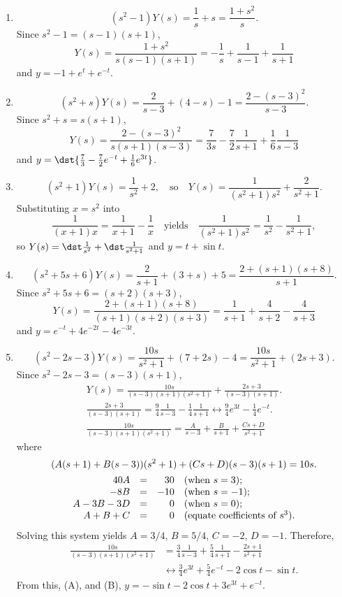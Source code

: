 \documentclass[openany]{book}
\newenvironment{sectionSolutions}{
 \begin{enumerate}[item-label={\thesection.\arabic{enumi}.}]
}{
 \end{enumerate}
}
\begin{document}
\begin{sectionSolutions}
\item
\[
(s^2-1)Y(s)=\frac{1}{ s}+s=\frac{1+s^2}{ s}.
\]
Since $s^2-1=(s-1)(s+1)$,
\[
Y(s)=\frac{1+s^2}{ s(s-1)(s+1)}=
-\frac{1}{ s}+\frac{1}{ s-1}+\frac{1}{ s+1}
\]
and
 $y=-1+e^t+e^{-t}$.


\item
\[
(s^2+s)Y(s)=\frac{2}{ s-3}+(4-s)-1=\frac{2-(s-3)^2}{ s-3}.
\]
Since $s^2+s=s(s+1)$,
\[
Y(s)=\frac{2-(s-3)^2}{ s(s+1)(s-3)}=\frac{7}{3s}-\frac{7}{2}\frac{1}{ s+1}
+\frac{1}{6}\frac{1}{ s-3}
\]
and $y=\dst{\frac{7}{3}-\frac{7}{2}e^{-t} +\frac{1}{6}e^{3t}}$.

\item
\[
(s^2+1)Y(s)=\frac{1}{ s^2}+2,\quad\text{so}\quad
Y(s)=\frac{1}{(s^2+1)s^2}+\frac{2}{ s^2+1}.
\]
Substituting $x=s^2$ into
\[
\frac{1}{(x+1)x}=\frac{1}{ x+1}-\frac{1}{ x}
\quad\text{yields}\quad
\frac{1}{(s^2+1)s^2}=\frac{1}{ s^2}-\frac{1}{ s^2+1},
\]
so $Y(s)=\dst\frac{1}{ s^2}+\dst\frac{1}{ s^2+1}$ and $y=t+\sin t$.

\item
\[
 (s^2+5s+6)Y(s)=\frac{2}{ s+1}+(3+s)+5=\frac{2+(s+1)(s+8)}{ s+1}.
\]
Since $s^2+5s+6=(s+2)(s+3)$,
\[
Y(s)=\frac{2+(s+1)(s+8)}{(s+1)(s+2)(s+3)}=
\frac{1}{ s+1}+\frac{4}{ s+2}-\frac{4}{ s+3}
\]
and
 $y=e^{-t}+4e^{-2t}-4e^{-3t}$.

\item
\[
(s^2-2s-3)Y(s)=\frac{10s}{ s^2+1}+(7+2s)-4=
\frac{10s}{ s^2+1}+(2s+3).
\]
Since $s^2-2s-3=(s-3)(s+1)$,
\begin{gather*}
Y(s)=
\frac{10s}{(s-3)(s+1)(s^2+1)}+\frac{2s+3}{(s-3)(s+1)}.
\tag{A}\\
\frac{2s+3}{(s-3)(s+1)}=\frac{9}{4}\frac{1}{ s-3}-\frac{1}{4}\frac{1}{ s+1}
\leftrightarrow\frac{9}{4}e^{3t}-\frac{1}{4}e^{-t}.
\tag{B}\\
\frac{10s}{(s-3)(s+1)(s^2+1)}=\frac{A}{ s-3}+\frac{B}{ s+1}+\frac{Cs+D}{ s^2+1}
\end{gather*}
 where
\begin{gather*}
(A(s+1)+B(s-3))(s^2+1)+(Cs+D)(s-3)(s+1)=10s.
\\
\begin{array}{rc rl}
40A&=&30&(\text{when }s=3);\\
-8B&=&-10& (\text{when }s=-1);\\
A-3B-3D&=&0& (\text{when }s=0);\\
A+B+C&=&0&(\text{equate coefficients of }s^3).
\end{array}
\end{gather*}
Solving this system yields $A=3/4$, $B=5/4$,
$C=-2$, $D=-1$. Therefore,
\begin{align*}
\frac{10s}{(s-3)(s+1)(s^2+1)}
&=\frac{3}{4}\frac{1}{ s-3}+\frac{5}{4}\frac{1}{ s+1}-\frac{2s+1}{ s^2+1}
\\&\leftrightarrow
\frac{3}{4}e^{3t}+\frac{5}{4}e^{-t}-2\cos t-\sin t.
\end{align*}
From this, (A), and (B),
 $y=-\sin t-2\cos t+3e^{3t}+e^{-t}$.




\end{sectionSolutions}
\end{document}
